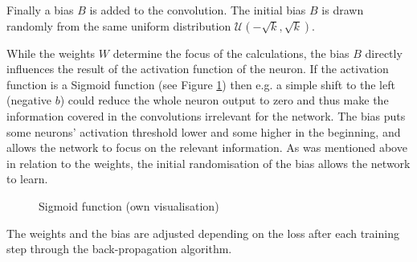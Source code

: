 \documentclass{article}
\begin{document}
Finally a bias $B$ is added to the convolution. The initial bias $B$ is drawn randomly from the same uniform distribution $\mathcal{U}(-\sqrt{k},\sqrt{k})$.

While the weights $W$ determine the focus of the calculations, the bias $B$ directly influences the result of the activation function of the neuron. If the activation function is a Sigmoid function (see Figure \ref{fig:sigmoid}) then e.g. a simple shift to the left (negative $b$) could reduce the whole neuron output to zero and thus make the information covered in the convolutions irrelevant for the network. The bias puts some neurons' activation threshold lower and some higher in the beginning, and allows the network to focus on the relevant information. As was mentioned above in relation to the weights, the initial randomisation of the bias allows the network to learn.
%
\begin{figure}[ht]
    \begin{center}
        \caption{Sigmoid function (own visualisation)}
        \label{fig:sigmoid}
    \end{center}
\end{figure}

%
The weights and the bias are adjusted depending on the loss after each training step through the back-propagation algorithm.
\end{document}
